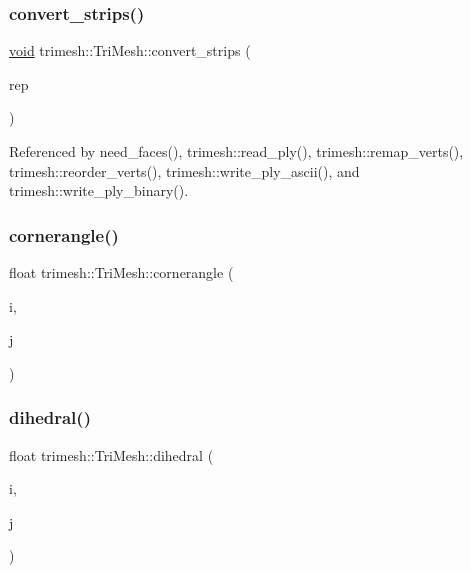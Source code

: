 \subsubsection{\texorpdfstring{convert\+\_\+strips()}{convert\_strips()}}
{\footnotesize\ttfamily \hyperlink{namespacetrimesh_a784ddfd979e1c579bda795a8edfc3f43}{void} trimesh\+::\+Tri\+Mesh\+::convert\+\_\+strips (\begin{DoxyParamCaption}\item[{\hyperlink{classtrimesh_1_1TriMesh_aff9bc745211e506ed76f7756b43cd114}{Tstrip\+Rep}}]{rep }\end{DoxyParamCaption})}



Referenced by need\+\_\+faces(), trimesh\+::read\+\_\+ply(), trimesh\+::remap\+\_\+verts(), trimesh\+::reorder\+\_\+verts(), trimesh\+::write\+\_\+ply\+\_\+ascii(), and trimesh\+::write\+\_\+ply\+\_\+binary().

\mbox{\label{classtrimesh_1_1TriMesh_a46d78ff16fb21643a67c2f58fd749758}} 
\subsubsection{\texorpdfstring{cornerangle()}{cornerangle()}}
{\footnotesize\ttfamily float trimesh\+::\+Tri\+Mesh\+::cornerangle (\begin{DoxyParamCaption}\item[{int}]{i,  }\item[{int}]{j }\end{DoxyParamCaption})\hspace{0.3cm}{\ttfamily [inline]}}

\mbox{\label{classtrimesh_1_1TriMesh_a6b15d408fb5d1d0f4781c565fd0d9554}} 
\subsubsection{\texorpdfstring{dihedral()}{dihedral()}}
{\footnotesize\ttfamily float trimesh\+::\+Tri\+Mesh\+::dihedral (\begin{DoxyParamCaption}\item[{int}]{i,  }\item[{int}]{j }\end{DoxyParamCaption})\hspace{0.3cm}{\ttfamily [inline]}}

